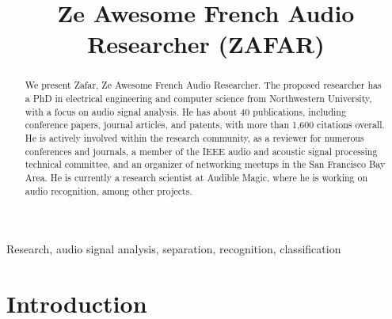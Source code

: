 \documentclass{article}
\title{Ze Awesome French Audio Researcher (ZAFAR)}
\begin{document}
\maketitle

\begin{abstract}
We present Zafar, Ze Awesome French Audio Researcher. The proposed researcher has a PhD in electrical engineering and computer science from Northwestern University, with a focus on audio signal analysis. He has about 40 publications, including conference papers, journal articles, and patents, with more than 1,600 citations overall. He is actively involved within the research community, as a reviewer for numerous conferences and journals, a member of the IEEE audio and acoustic signal processing technical committee, and an organizer of networking meetups in the San Francisco Bay Area. He is currently a research scientist at Audible Magic, where he is working on audio recognition, among other projects.
\end{abstract}

\begin{keywords}
Research, audio signal analysis, separation, recognition, classification
\end{keywords}

\section{Introduction}
\label{sec:intro}

\nocite{patent_cremer_may2021}
\nocite{patent_rafii_may2021}
\nocite{patent_cremer_feb2021}
\nocite{patent_rafii_jan2021}
\nocite{patent_rafii_dec2020}
\nocite{patent_rafii_oct20202}
\nocite{patent_rafii_oct2020}
\nocite{patent_rafii_jul20202}
\nocite{patent_rafii_jul2020}
\nocite{patent_coover_mar2020}
\nocite{patent_pardo_jul2015}

\nocite{article_rafii_may2022}
\nocite{article_rafii_nov2018}
\nocite{article_rafii_aug2018}
\nocite{article_rafii_dec2014}
\nocite{article_liutkus_aug2014}
\nocite{article_rafii_jan2013}
\nocite{article_sabin_jun2013}

\nocite{inproceedings_vartakavi_aug2021}
\nocite{inproceedings_kim_sep2018}
\nocite{inproceedings_seetharaman_mar2017}
\nocite{inproceedings_fitzgerald_mar2017}
\nocite{inproceedings_liutkus_feb2017}
\nocite{inproceedings_ono_aug2015}
\nocite{inproceedings_rafii_apr2015}
\nocite{inproceedings_liutkus_apr2015}
\nocite{inproceedings_fitzgerald_jun2014}
\nocite{inproceedings_liutkus_may2014}
\nocite{inproceedings_rafii_may2014}
\nocite{inproceedings_rafii_nov2013}
\nocite{inproceedings_rafii_may2013}
\nocite{inproceedings_rafii_oct2012}
\nocite{inproceedings_liutkus_mar2012}
\nocite{inproceedings_cartwright_aug2011}
\nocite{inproceedings_rafii_may2011}
\nocite{inproceedings_rafii_may2011_2}
\nocite{inproceedings_rafii_oct2009}
\end{document}
